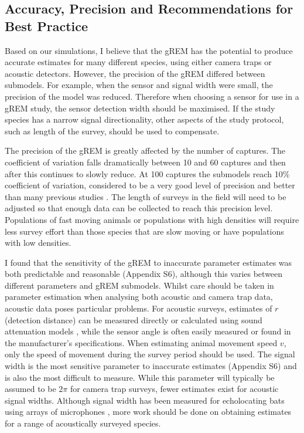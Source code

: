 \subsection{Accuracy, Precision and Recommendations for Best Practice}
Based on our simulations, I believe that the gREM has the potential to produce accurate estimates for many different species, using either camera traps or acoustic detectors.
However, the precision of the gREM differed between submodels.
For example, when the sensor and signal width were small, the precision of the model was reduced.
Therefore when choosing a sensor for use in a gREM study, the sensor detection width should be maximised.
If the study species has a narrow signal directionality, other aspects of the study protocol, such as length of the survey, should be used to compensate. 

The precision of the gREM is greatly affected by the number of captures.
The coefficient of variation falls dramatically between 10 and 60 captures and then after this continues to slowly reduce.
At 100 captures the submodels reach 10\% coefficient of variation, considered to be a very good level of precision and better than many previous studies \cite{thomas2012passive, o2003crouching, foster2012critique}.  The length of surveys in the field will need to be adjusted so that enough data can be collected to reach this precision level.
Populations of fast moving animals or populations with high densities will require less survey effort than those species that are slow moving or have populations with low densities. 

I found that the sensitivity of the gREM to inaccurate parameter estimates was both predictable and reasonable (Appendix S6), although this varies between different parameters and gREM submodels.
Whilst care should be taken in parameter estimation when analysing both acoustic and camera trap data, acoustic data poses particular problems.
For acoustic surveys, estimates of $r$ (detection distance) can be measured directly or calculated using sound attenuation models \cite{holderied2003echolocation}, while the sensor angle is often easily measured \cite{adams2012you} or found in the manufacturer's specifications.
When estimating animal movement speed $v$, only the speed of movement during the survey period should be used.
The signal width is the most sensitive parameter to inaccurate estimates (Appendix S6) and is also the most difficult to measure.  While this parameter will typically be assumed to be $2\pi$ for camera trap surveys, fewer estimates exist for acoustic signal widths.
Although signal width has been measured for echolocating bats using arrays of microphones \cite{brinklov2011}, more work should be done on obtaining estimates for a range of acoustically surveyed species.




